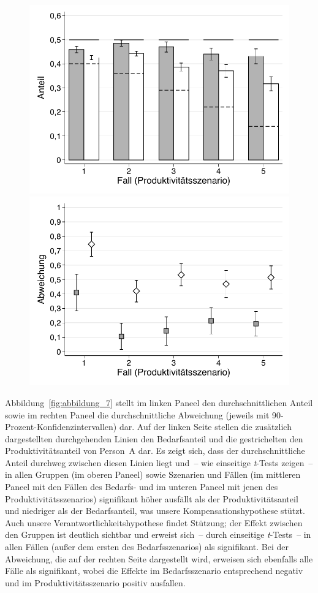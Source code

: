 \documentclass[justified,nobib,symmetric,twoside]{tufte-handout}
\begin{document}
\begin{figure}[t]
   \includegraphics[width=0.49\linewidth]{figure_7_e.pdf}
   \includegraphics[width=0.49\linewidth]{figure_7_f.pdf}
\end{figure}

Abbildung~\ref{fig:abbildung_7} stellt im linken Paneel den durchschnittlichen Anteil sowie im rechten Paneel die durchschnittliche Abweichung (jeweils mit 90-Prozent-Konfidenz\-intervallen) dar.
Auf der linken Seite stellen die zusätzlich dargestellten durchgehenden Linien den Bedarfsanteil und die gestrichelten den Produktivitätsanteil von Person~A dar.
Es zeigt sich, dass der durchschnittliche Anteil durchweg zwischen diesen Linien liegt und~-- wie einseitige \textit{t}-Tests zeigen~-- in allen Gruppen (im oberen Paneel) sowie Szenarien und Fällen (im mittleren Paneel mit den Fällen des Bedarfs- und im unteren Paneel mit jenen des Produktivitätsszenarios) signifikant höher ausfällt als der Produktivitätsanteil und niedriger als der Bedarfsanteil, was unsere Kompensationshypothese stützt.
Auch unsere Verantwortlichkeitshypothese findet Stützung; der Effekt zwischen den Gruppen ist deutlich sichtbar und erweist sich~-- durch einseitige \textit{t}-Tests~-- in allen Fällen (außer dem ersten des Bedarfsszenarios) als signifikant.
Bei der Abweichung, die auf der rechten Seite dargestellt wird, erweisen sich ebenfalls alle Fälle als signifikant, wobei die Effekte im Bedarfsszenario entsprechend negativ und im Produktivitätsszenario positiv ausfallen.
\end{document}
